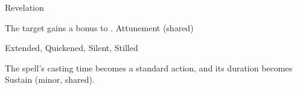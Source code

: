\begin{spellsection}{Revelation}
\begin{spellheader}
\end{spellheader}
\begin{spellcontent}
\begin{spelltargetinginfo}
\end{spelltargetinginfo}
\begin{spelleffects}
\spelleffect
The target gains a  bonus to .
\spelldur Attunement (shared)
\end{spelleffects}
\end{spellcontent}
\begin{spellfooter}
 Extended, Quickened, Silent, Stilled
\end{spellfooter}
\begin{spellsubcontent}
\begin{spellcantrip}
The spell's casting time becomes a standard action, and its duration becomes Sustain (minor, shared).
\end{spellcantrip}
\end{spellsubcontent}
\end{spellsection}
